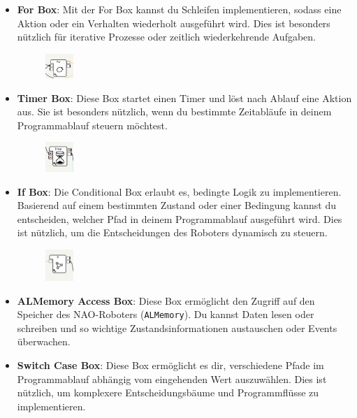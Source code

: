 \begin{itemize}
    \item \textbf{For Box}: Mit der For Box kannst du Schleifen implementieren, sodass eine Aktion oder ein Verhalten wiederholt ausgeführt wird. Dies ist besonders nützlich für iterative Prozesse oder zeitlich wiederkehrende Aufgaben.
    \begin{figure}[h]
        \centering
        \includegraphics[width=0.1\textwidth]{../images/forBox.png}
        \label{fig:forBox}
    \end{figure}
    \item \textbf{Timer Box}: Diese Box startet einen Timer und löst nach Ablauf eine Aktion aus. Sie ist besonders nützlich, wenn du bestimmte Zeitabläufe in deinem Programmablauf steuern möchtest.
    \begin{figure}[h]
        \centering
        \includegraphics[width=0.1\textwidth]{../images/timerBox.png}
        \label{fig:timerBox}
    \end{figure} 
    \item \textbf{If Box}: Die Conditional Box erlaubt es, bedingte Logik zu implementieren. Basierend auf einem bestimmten Zustand oder einer Bedingung kannst du entscheiden, welcher Pfad in deinem Programmablauf ausgeführt wird. Dies ist nützlich, um die Entscheidungen des Roboters dynamisch zu steuern.
    \begin{figure}[h]
        \centering
        \includegraphics[width=0.1\textwidth]{../images/ifBox.png}
        \label{fig:ifBox}
    \end{figure} 
    \item \textbf{ALMemory Access Box}: Diese Box ermöglicht den Zugriff auf den Speicher des NAO-Roboters (\texttt{ALMemory}). Du kannst Daten lesen oder schreiben und so wichtige Zustandsinformationen austauschen oder Events überwachen.
    \item \textbf{Switch Case Box}: Diese Box ermöglicht es dir, verschiedene Pfade im Programmablauf abhängig vom eingehenden Wert auszuwählen. Dies ist nützlich, um komplexere Entscheidungsbäume und Programmflüsse zu implementieren.

\end{itemize}
